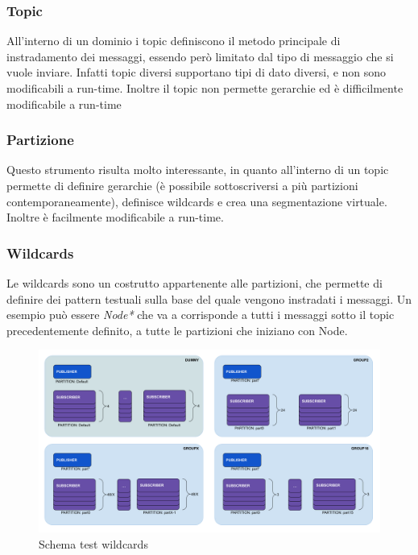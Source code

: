 \subsubsection*{Topic}
All'interno di un dominio i topic definiscono il metodo principale di instradamento dei messaggi, essendo però limitato dal tipo di messaggio che si vuole inviare. Infatti topic diversi supportano tipi di dato diversi, e non sono modificabili a run-time. %
Inoltre il topic non permette gerarchie ed è difficilmente modificabile a run-time

\subsubsection*{Partizione}
Questo strumento risulta molto interessante, in quanto all'interno di un topic permette di definire gerarchie (è possibile sottoscriversi a più partizioni contemporaneamente), definisce wildcards e crea una segmentazione virtuale. Inoltre è facilmente modificabile a run-time.

\subsubsection{Wildcards}
Le wildcards sono un costrutto appartenente alle partizioni, che permette di definire dei pattern testuali sulla base del quale vengono instradati i messaggi. Un esempio può essere \textit{Node*} che va a corrisponde a tutti i messaggi sotto il topic precedentemente definito, a tutte le partizioni che iniziano con Node.

\begin{figure}[H]
    \includegraphics[width=\textwidth]{./img/wildcards.png}
    \caption{Schema test wildcards}
    \label{fig:test_UML_wildcards}
\end{figure} 



